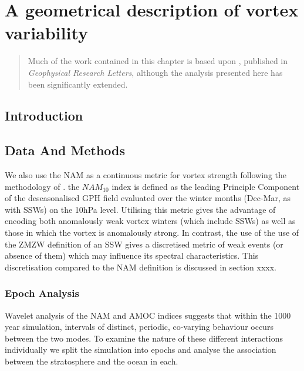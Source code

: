\chapter{A geometrical description of vortex variability}
\begin{quotation}
  Much of the work contained in this chapter is based upon \citet{Seviour2013},
  published in \emph{Geophysical Research Letters}, although the analysis
  presented here has been significantly extended.
\end{quotation}

\label{cha:moments}


\section{Introduction}



\section{Data And Methods}

We also use the NAM as a continuous metric for vortex strength following the methodology of \cite{baldwinStratospheric2001}. the $NAM_{10}$ index is defined as the leading Principle Component of the deseasonalised GPH field evaluated over the winter months (Dec-Mar, as with SSWs) on the 10hPa level. Utilising this metric gives the advantage of encoding both anomalously weak vortex winters (which include SSWs) as well as those in which the vortex is anomalously strong. In contrast, the use of the use of the ZMZW definition of an SSW gives a discretised metric of weak events (or absence of them) which may influence its spectral characteristics. This discretisation compared to the NAM definition is discussed in section xxxx.







\subsection{Epoch Analysis}
Wavelet analysis of the NAM and AMOC indices suggests that within the 1000 year simulation, intervals of distinct, periodic, co-varying behaviour occurs between the two modes. To examine the nature of these different interactions individually we split the simulation into epochs and analyse the association between the stratosphere and the ocean in each. 

